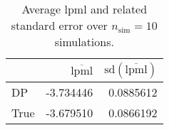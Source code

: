 \begin{table}[H]

\caption{Average lpml and related standard error over $n_{\text{sim}} = 10$ simulations.}
\centering
\begin{tabular}[t]{lrr}
\toprule
  & $\overbar{\text{lpml}}$ & $\text{sd}(\overbar{\text{lpml}})$\\
\midrule
DP & -3.734446 & 0.0885612\\
True & -3.679510 & 0.0866192\\
\bottomrule
\end{tabular}
\end{table}